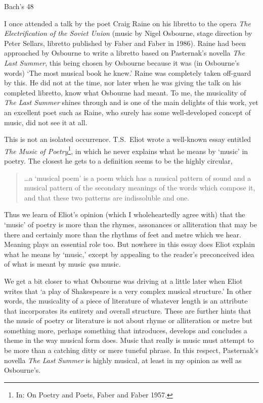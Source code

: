 

\prelude

Bach's 48

\fugue

I once attended a talk by the poet Craig Raine on his libretto
to the opera \textit{The Electrification of the Soviet Union}
(music by Nigel Osbourne, stage direction by Peter Sellars,
libretto published by Faber and Faber in 1986).
Raine had been approached by Osbourne to write a libretto
based on Pasternak's novella \textit{The Last Summer}, this being
chosen by Osbourne because it was (in Osbourne's words) `The
most musical book he knew.'  Raine was completely taken off-guard
by this.  He did not at the time, nor later when he was giving
the talk on his completed libretto, know what Osbourne had meant.
To me, the musicality of \textit{The Last Summer} shines through
and is one of the main delights of this work, yet an excellent poet
such as Raine, who surely has some well-developed concept of music, did not see it
at all.

This is not an isolated occurrence. T.S.~Eliot wrote a well-known
essay entitled \textit{The Music of Poetry}\footnote{In: On Poetry and
Poets, Faber and Faber 1957.}, in which he never explains what he
means by `music' in poetry.  The closest he gets to a definition
seems to be the highly circular,
\begin{quote}
\ldots a `musical poem' is a poem which has a musical pattern
of sound and a musical pattern of the secondary meanings of the
words which compose it, and that these  two patterns are indissoluble and one.
\end{quote}

Thus we learn of Eliot's opinion (which I wholeheartedly agree with)
that the `music' of poetry is more than the rhymes, assonances or alliteration
that may be there and certainly more than the rhythms of feet and metre
which we hear.
Meaning plays an essential role too.  But nowhere in this essay
does Eliot explain what he means by `music,' except by appealing to
the reader's preconceived idea of what is meant by music \textit{qua} music.

We get a bit closer to what Osbourne was driving at a little later
when Eliot writes that `a play of Shakespeare is a very complex musical
structure.'  In other words, the musicality of a piece of literature
of whatever length is an attribute that incorporates its entirety and overall structure.
These are further hints that the music of poetry or literature is not about
rhyme or alliteration or metre but something more, perhaps something that
introduces, develops and concludes a theme in the way musical form does.
Music that really is music must attempt
to be more than a catching ditty or mere tuneful phrase.  In this respect,
Pasternak's novella \textit{The Last Summer} is highly musical, at least in
my opinion as well as Osbourne's.

